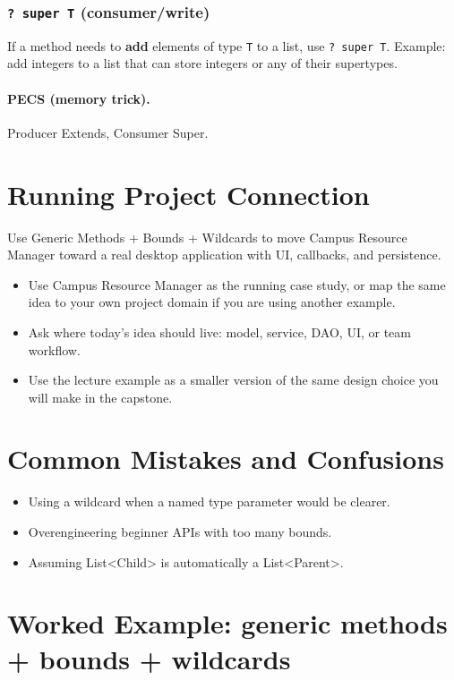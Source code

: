 \documentclass[11pt]{article}
\begin{document}
\subsubsection{\texttt{? super T} (consumer/write)}
If a method needs to \textbf{add} elements of type \texttt{T} to a list, use \texttt{? super T}.
Example: add integers to a list that can store integers or any of their supertypes.

\paragraph{PECS (memory trick).} Producer Extends, Consumer Super.
\notesources{\OOPSUnitIVSources}

\section{Running Project Connection}
Use Generic Methods + Bounds + Wildcards to move Campus Resource Manager toward a real desktop application with UI, callbacks, and persistence.
\begin{itemize}
  \item Use Campus Resource Manager as the running case study, or map the same idea to your own project domain if you are using another example.
  \item Ask where today's idea should live: model, service, DAO, UI, or team workflow.
  \item Use the lecture example as a smaller version of the same design choice you will make in the capstone.
\end{itemize}
\notesources{\OOPSUnitIVSources}

\section{Common Mistakes and Confusions}
\begin{itemize}
  \item Using a wildcard when a named type parameter would be clearer.
  \item Overengineering beginner APIs with too many bounds.
  \item Assuming List<Child> is automatically a List<Parent>.
\end{itemize}
\notesources{\OOPSUnitIVSources}

\section{Worked Example: generic methods + bounds + wildcards}
\end{document}
